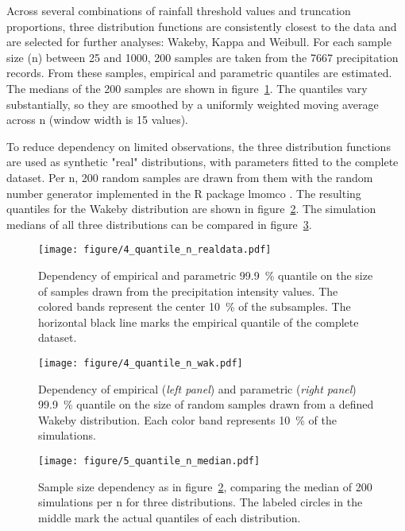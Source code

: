 \documentclass[a4paper]{article}
\begin{document}
\begin{multicols}{2}
Across several combinations of rainfall threshold values and truncation proportions, three distribution functions are consistently closest to the data and are selected for further analyses: Wakeby, Kappa and Weibull. 
For each sample size (n) between 25 and 1000, 200 samples are taken from the 7667 precipitation records.
From these samples, empirical and parametric quantiles are estimated.
The medians of the 200 samples are shown in figure~\ref{fig:quantnreal}.
The quantiles vary substantially, so they are smoothed by a uniformly weighted moving average across n (window width is 15 values).

To reduce dependency on limited observations, the three distribution functions are used as synthetic "real" distributions, with parameters fitted to the complete dataset.
Per n, 200 random samples are drawn from them with the random number generator implemented in the R package lmomco \citep{asquith_lmomco:_2015}.
The resulting quantiles for the Wakeby distribution are shown in figure~\ref{fig:quantnwak}.
The simulation medians of all three distributions can be compared in figure~\ref{fig:quantnmedian}.

\begin{figure}[H] %
\texttt{[image: figure/4\_quantile\_n\_realdata.pdf]}
\caption[Sample size dependency observed data]{Dependency of empirical and parametric 99.9~\% quantile on the size of samples drawn from the precipitation intensity values. The colored bands represent the center 10~\% of the subsamples. The horizontal black line marks the empirical quantile of the complete dataset.}
\label{fig:quantnreal}
\end{figure}

\end{multicols}

\begin{figure}[H] %
\texttt{[image: figure/4\_quantile\_n\_wak.pdf]}
\caption[Sample size dependency Wakeby]{Dependency of empirical (\textit{left panel}) and parametric (\textit{right panel}) 99.9~\% quantile on the size of random samples drawn from a defined Wakeby distribution. Each color band represents 10~\% of the simulations.}
\label{fig:quantnwak}
\end{figure}

\begin{figure}[H] %
\texttt{[image: figure/5\_quantile\_n\_median.pdf]}
\caption[Sample size dependency medians]{Sample size dependency as in figure~\ref{fig:quantnwak}, comparing the median of 200 simulations per n for three distributions. The labeled circles in the middle mark the actual quantiles of each distribution.}
\label{fig:quantnmedian}
\end{figure}
\end{document}
